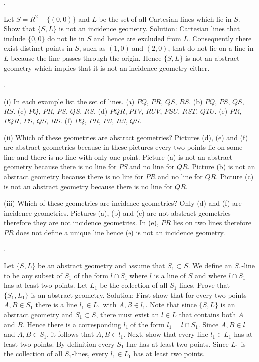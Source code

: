 .

Let $S=R^2-\{(0,0)\}$ and $L$ be the set of all Cartesian lines which lie
in $S$.
Show that $\{S,L\}$ is not an incidence geometry.
\medskip
Solution: Cartesian lines that include $\{0,0\}$ do not lie in $S$
and hence are excluded from $L$.
Consequently there exist distinct points in $S$, such as $(1,0)$ and $(2,0)$,
that do not lie on a line in $L$ because the line passes through the origin.
Hence $\{S,L\}$ is not an abstract geometry which implies that it is not
an incidence geometry either. 


.

(i) In each example list the set of lines.
(a) $PQ$, $PR$, $QS$, $RS$.
(b) $PQ$, $PS$, $QS$, $RS$.
(c) $PQ$, $PR$, $PS$, $QS$, $RS$.
(d) $PQR$, $PTV$, $RUV$, $PSU$, $RST$, $QTU$.
(e) $PR$, $PQR$, $PS$, $QS$, $RS$.
(f) $PQ$, $PR$, $PS$, $RS$, $QS$.

\medskip
(ii) Which of these geometries are abstract geometries?
Pictures (d), (e) and (f) are abstract geometries because in
these pictures every two points lie on some line and there is
no line with only one point.
Picture (a) is not an abstract geometry because there is no line
for $PS$ and no line for $QR$.
Picture (b) is not an abstract geometry because there is no line
for $PR$ and no line for $QR$.
Picture (c) is not an abstract geometry because there is no line
for $QR$.

\medskip
(iii) Which of these geometries are incidence geometries?
Only (d) and (f) are incidence geometries.
Pictures (a), (b) and (c) are not abstract geometries therefore
they are not incidence geometries.
In (e), $PR$ lies on two lines therefore $PR$ does not
define a unique line hence (e) is not an incidence geometry.

.

Let $\{S,L\}$ be an abstract geometry and assume that
$S_1\subset S$.
We define an $S_1$-line to be any subset of $S_1$ of the form
$l\cap S_1$ where $l$ is a line of $S$ and where $l\cap S_1$ has
at least two points.
Let $L_1$ be the collection of all $S_1$-lines.
Prove that $\{S_1,L_1\}$ is an abstract geometry.
\medskip
Solution: First show that for every two points $A,B\in S_1$ there is
a line $l_1\in L_1$ with $A,B\in l_1$.
Note that since $\{S,L\}$ is an abstract geometry and $S_1\subset S$,
there must exist an $l\in L$
that contains both $A$ and $B$.
Hence there is a corresponding $l_1$ of the form
$l_1=l\cap S_1$.
Since $A,B\in l$ and $A,B\in S_1$, it follows that $A,B\in l_1$.
\medskip
Next, show that every line $l_1\in L_1$ has at least two points.
By definition every $S_1$-line has at least two points.
Since $L_1$ is the collection of all $S_1$-lines, every
$l_1\in L_1$ has at least two points.

